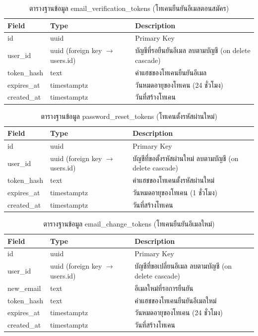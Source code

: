 \begin{table}[H]
\centering
\caption{ตารางฐานข้อมูล email\_verification\_tokens (โทเคนยืนยันอีเมลตอนสมัคร)}
\label{tab:db_evtokens}
\begin{tabular}{|p{3.6cm}|p{2.6cm}|p{6.8cm}|}
\hline
\textbf{Field} & \textbf{Type} & \textbf{Description} \\
\hline
id & uuid & Primary Key \\ \hline
user\_id & uuid (foreign key $\to$ users.id) & บัญชีที่รอยืนยันอีเมล ลบตามบัญชี (on delete cascade) \\ \hline
token\_hash & text & ค่าแฮชของโทเคนยืนยันอีเมล \\ \hline
expires\_at & timestamptz & วันหมดอายุของโทเคน (24 ชั่วโมง) \\ \hline
created\_at & timestamptz & วันที่สร้างโทเคน \\
\hline
\end{tabular}
\end{table}

\begin{table}[H]
\centering
\caption{ตารางฐานข้อมูล password\_reset\_tokens (โทเคนตั้งรหัสผ่านใหม่)}
\label{tab:db_prtokens}
\begin{tabular}{|p{3.6cm}|p{2.6cm}|p{6.8cm}|}
\hline
\textbf{Field} & \textbf{Type} & \textbf{Description} \\
\hline
id & uuid & Primary Key \\ \hline
user\_id & uuid (foreign key $\to$ users.id) & บัญชีที่ขอตั้งรหัสผ่านใหม่ ลบตามบัญชี (on delete cascade) \\ \hline
token\_hash & text & ค่าแฮชของโทเคนตั้งรหัสผ่านใหม่ \\ \hline
expires\_at & timestamptz & วันหมดอายุของโทเคน (1 ชั่วโมง) \\ \hline
created\_at & timestamptz & วันที่สร้างโทเคน \\
\hline
\end{tabular}
\end{table}

\begin{table}[H]
\centering
\caption{ตารางฐานข้อมูล email\_change\_tokens (โทเคนยืนยันอีเมลใหม่)}
\label{tab:db_ectokens}
\begin{tabular}{|p{3.6cm}|p{2.6cm}|p{6.8cm}|}
\hline
\textbf{Field} & \textbf{Type} & \textbf{Description} \\
\hline
id & uuid & Primary Key \\ \hline
user\_id & uuid (foreign key $\to$ users.id) & บัญชีที่ขอเปลี่ยนอีเมล ลบตามบัญชี (on delete cascade) \\ \hline
new\_email & text & อีเมลใหม่ที่รอการยืนยัน \\ \hline
token\_hash & text & ค่าแฮชของโทเคนยืนยันอีเมลใหม่ \\ \hline
expires\_at & timestamptz & วันหมดอายุของโทเคน (24 ชั่วโมง) \\ \hline
created\_at & timestamptz & วันที่สร้างโทเคน \\
\hline
\end{tabular}
\end{table}

